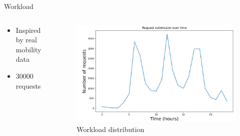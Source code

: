 \documentclass[Ligatures=TeX,table,svgnames,usetotalslideindicator,compress,10pt,aspectratio=169]{beamer}
\begin{document}
\begin{frame}{Workload}
\begin{columns}        
\begin{column}{0.4\textwidth}

  \begin{itemize}
      \item Inspired by real mobility data \footnotemark[2]
      \item 30000 requests 
  \end{itemize}
  \end{column}
\begin{column}{0.6\textwidth}

    \begin{figure}[!h]
    \centering
    \includegraphics[width=\textwidth]{images/workload.png}
    \caption{Workload distribution}
    
  \end{figure}
    \end{column}
  \end{columns}

  \end{frame}
\end{document}
